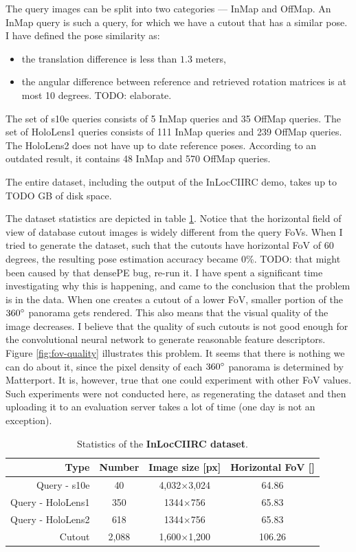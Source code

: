 \documentclass[twoside]{ctuthesis}
\theoremstyle{plain}
\theoremstyle{definition}
\theoremstyle{note}
\begin{document}
The query images can be split into two categories --- InMap and OffMap. An InMap query is such a query, for which we have a cutout that has a similar pose. I have defined the pose similarity as:

\begin{itemize}
	\item the translation difference is less than $1.3$ meters,
	\item the angular difference between reference and retrieved rotation matrices is at most 10 degrees. TODO: elaborate.
\end{itemize}

The set of s10e queries consists of 5 InMap queries and 35 OffMap queries. The set of HoloLens1 queries consists of 111 InMap queries and 239 OffMap queries. The HoloLens2 does not have up to date reference poses. According to an outdated result, it contains 48 InMap and 570 OffMap queries.

The entire dataset, including the output of the InLocCIIRC demo, takes up to TODO GB of disk space.

The dataset statistics are depicted in table \ref{tab:dataset-statistics}. Notice that the horizontal field of view of database cutout images is widely different from the query FoVs. When I tried to generate the dataset, such that the cutouts have horizontal FoV of 60 degrees, the resulting pose estimation accuracy became 0\%. TODO: that might been caused by that densePE bug, re-run it. I have spent a significant time investigating why this is happening, and came to the conclusion that the problem is in the data. When one creates a cutout of a lower FoV, smaller portion of the $360\degree$ panorama gets rendered. This also means that the visual quality of the image decreases. I believe that the quality of such cutouts is not good enough for the convolutional neural network to generate reasonable feature descriptors. Figure \ref{fig:fov-quality} illustrates this problem. It seems that there is nothing we can do about it, since the pixel density of each $360\degree$ panorama is determined by Matterport. It is, however, true that one could experiment with other FoV values. Such experiments were not conducted here, as regenerating the dataset and then uploading it to an evaluation server takes a lot of time (one day is not an exception).

\begin{table}[t]
    \centering
    {\footnotesize
	\begin{tabular}{|r||c|c|c|}
	\hline
	Type & Number & Image size [px] & Horizontal FoV [\degree] \\[1pt]
	\hline
    Query - s10e & 40 & 4,032$\times$3,024 & 64.86 \\[1pt]
    Query - HoloLens1 & 350 & 1344$\times$756 & 65.83 \\[1pt]
    Query - HoloLens2 & 618 & 1344$\times$756 & 65.83 \\[1pt]
	Cutout & 2,088 & 1,600$\times$1,200 & 106.26 \\[3pt]
	\hline
    \end{tabular}
	\caption{Statistics of the {\bf InLocCIIRC dataset}.}
	\label{tab:dataset-statistics}
    }
\end{table}
\end{document}
